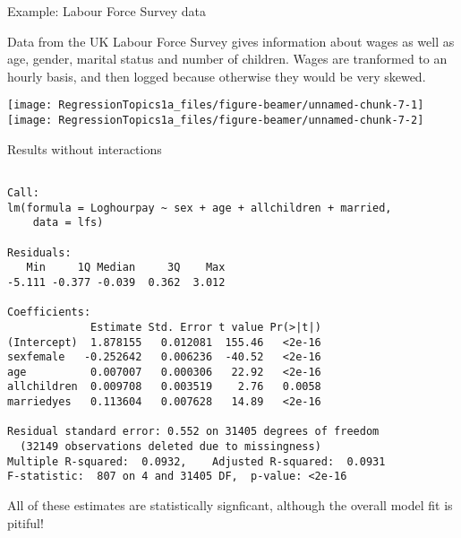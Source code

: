 \documentclass[10pt,ignorenonframetext,]{beamer}
\begin{document}
\begin{frame}{Example: Labour Force Survey data}

Data from the UK Labour Force Survey gives information about wages as
well as age, gender, marital status and number of children. Wages are
tranformed to an hourly basis, and then logged because otherwise they
would be very skewed.

\texttt{[image: RegressionTopics1a\_files/figure-beamer/unnamed-chunk-7-1]}
\texttt{[image: RegressionTopics1a\_files/figure-beamer/unnamed-chunk-7-2]}

\end{frame}

\begin{frame}[fragile]{Results without interactions}

\footnotesize

\begin{verbatim}

Call:
lm(formula = Loghourpay ~ sex + age + allchildren + married,
    data = lfs)

Residuals:
   Min     1Q Median     3Q    Max
-5.111 -0.377 -0.039  0.362  3.012

Coefficients:
             Estimate Std. Error t value Pr(>|t|)
(Intercept)  1.878155   0.012081  155.46   <2e-16
sexfemale   -0.252642   0.006236  -40.52   <2e-16
age          0.007007   0.000306   22.92   <2e-16
allchildren  0.009708   0.003519    2.76   0.0058
marriedyes   0.113604   0.007628   14.89   <2e-16

Residual standard error: 0.552 on 31405 degrees of freedom
  (32149 observations deleted due to missingness)
Multiple R-squared:  0.0932,    Adjusted R-squared:  0.0931
F-statistic:  807 on 4 and 31405 DF,  p-value: <2e-16
\end{verbatim}

All of these estimates are statistically signficant, although the
overall model fit is pitiful!

\end{frame}
\end{document}
